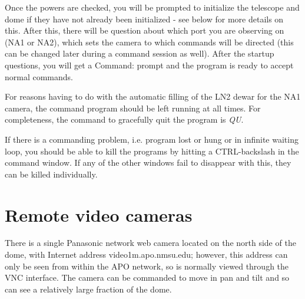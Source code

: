 \documentclass[10pt]{report}
\begin{document}
Once the powers are checked, you will be prompted to initialize the telescope
and dome if they have not already been initialized - see below for more details on
this. After this, there will be question about which port you are observing
on (NA1 or NA2), which sets the camera to which commands will be directed (this
can be changed later during a command session as well). After the startup
questions, you will get a Command: prompt and the program is
ready to accept normal commands.

For reasons having to do with the automatic filling of the LN2 dewar for
the NA1 camera, the command program should be left running at all times.
For completeness, the command to gracefully quit the program is \textit{QU}.

If there is a commanding problem, i.e. program lost or hung or in infinite
waiting loop, you should be able to kill the programs by hitting a 
CTRL-backslash
in the command window. If any of the other windows fail to disappear with
this, they can be killed individually.


\section{Remote video cameras}

There is a single Panasonic network web camera located on the north side 
of the dome, with Internet address video1m.apo.nmsu.edu; however, this 
address can only be seen from within the APO network, so is normally viewed
through the VNC interface. The camera can be commanded to move in pan and
tilt and so can see a relatively large fraction of the dome.
\end{document}
